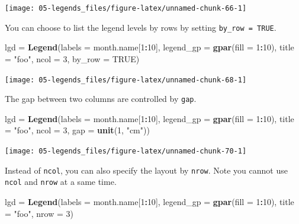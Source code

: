 \documentclass[]{book}
\newenvironment{Shaded}{\begin{snugshade}}{\end{snugshade}}
\newcommand{\KeywordTok}[1]{\textcolor[rgb]{0.13,0.29,0.53}{\textbf{#1}}}
\newcommand{\DataTypeTok}[1]{\textcolor[rgb]{0.13,0.29,0.53}{#1}}
\newcommand{\DecValTok}[1]{\textcolor[rgb]{0.00,0.00,0.81}{#1}}
\newcommand{\StringTok}[1]{\textcolor[rgb]{0.31,0.60,0.02}{#1}}
\newcommand{\OtherTok}[1]{\textcolor[rgb]{0.56,0.35,0.01}{#1}}
\newcommand{\OperatorTok}[1]{\textcolor[rgb]{0.81,0.36,0.00}{\textbf{#1}}}
\newcommand{\NormalTok}[1]{#1}
\theoremstyle{definition}
\theoremstyle{definition}
\theoremstyle{definition}
\theoremstyle{remark}
\begin{document}
\begin{center}\texttt{[image: 05-legends\_files/figure-latex/unnamed-chunk-66-1]} \end{center}

You can choose to list the legend levels by rows by setting
\texttt{by\_row\ =\ TRUE}.

\begin{Shaded}
\begin{Highlighting}[]
\NormalTok{lgd =}\StringTok{ }\KeywordTok{Legend}\NormalTok{(}\DataTypeTok{labels =}\NormalTok{ month.name[}\DecValTok{1}\OperatorTok{:}\DecValTok{10}\NormalTok{], }\DataTypeTok{legend_gp =} \KeywordTok{gpar}\NormalTok{(}\DataTypeTok{fill =} \DecValTok{1}\OperatorTok{:}\DecValTok{10}\NormalTok{), }\DataTypeTok{title =} \StringTok{"foo"}\NormalTok{, }
    \DataTypeTok{ncol =} \DecValTok{3}\NormalTok{, }\DataTypeTok{by_row =} \OtherTok{TRUE}\NormalTok{)}
\end{Highlighting}
\end{Shaded}

\begin{center}\texttt{[image: 05-legends\_files/figure-latex/unnamed-chunk-68-1]} \end{center}

The gap between two columns are controlled by \texttt{gap}.

\begin{Shaded}
\begin{Highlighting}[]
\NormalTok{lgd =}\StringTok{ }\KeywordTok{Legend}\NormalTok{(}\DataTypeTok{labels =}\NormalTok{ month.name[}\DecValTok{1}\OperatorTok{:}\DecValTok{10}\NormalTok{], }\DataTypeTok{legend_gp =} \KeywordTok{gpar}\NormalTok{(}\DataTypeTok{fill =} \DecValTok{1}\OperatorTok{:}\DecValTok{10}\NormalTok{), }\DataTypeTok{title =} \StringTok{"foo"}\NormalTok{, }
    \DataTypeTok{ncol =} \DecValTok{3}\NormalTok{, }\DataTypeTok{gap =} \KeywordTok{unit}\NormalTok{(}\DecValTok{1}\NormalTok{, }\StringTok{"cm"}\NormalTok{))}
\end{Highlighting}
\end{Shaded}

\begin{center}\texttt{[image: 05-legends\_files/figure-latex/unnamed-chunk-70-1]} \end{center}

Instead of \texttt{ncol}, you can also specify the layout by
\texttt{nrow}. Note you cannot use \texttt{ncol} and \texttt{nrow} at a
same time.

\begin{Shaded}
\begin{Highlighting}[]
\NormalTok{lgd =}\StringTok{ }\KeywordTok{Legend}\NormalTok{(}\DataTypeTok{labels =}\NormalTok{ month.name[}\DecValTok{1}\OperatorTok{:}\DecValTok{10}\NormalTok{], }\DataTypeTok{legend_gp =} \KeywordTok{gpar}\NormalTok{(}\DataTypeTok{fill =} \DecValTok{1}\OperatorTok{:}\DecValTok{10}\NormalTok{), }
    \DataTypeTok{title =} \StringTok{"foo"}\NormalTok{, }\DataTypeTok{nrow =} \DecValTok{3}\NormalTok{)}
\end{Highlighting}
\end{Shaded}
\end{document}
